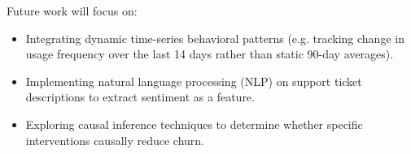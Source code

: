 \documentclass[11pt, a4paper]{article}
\begin{document}
Future work will focus on:
\begin{itemize}[leftmargin=*]
    \item Integrating dynamic time-series behavioral patterns (e.g. tracking change in usage frequency over the last 14 days rather than static 90-day averages).
    \item Implementing natural language processing (NLP) on support ticket descriptions to extract sentiment as a feature.
    \item Exploring causal inference techniques to determine whether specific interventions causally reduce churn.
\end{itemize}
\end{document}
